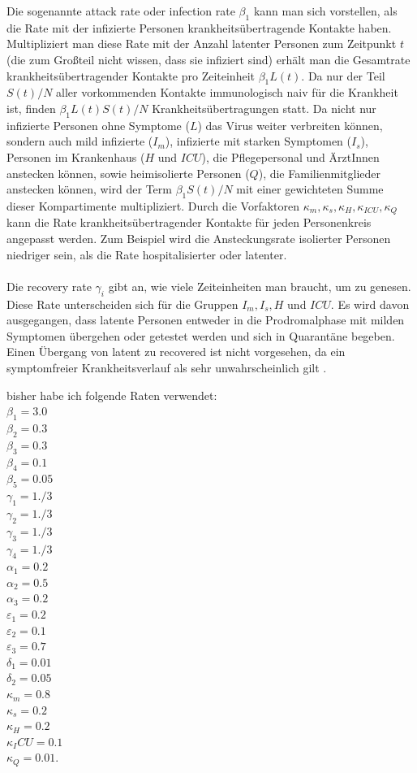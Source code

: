 \documentclass[twoside]{article}
\begin{document}
Die sogenannte attack rate oder infection rate $\beta_1$ kann man sich vorstellen, als die Rate mit der infizierte Personen krankheits\"ubertragende Kontakte haben. Multipliziert man diese Rate mit der Anzahl latenter Personen zum Zeitpunkt $t$ (die zum Gro\ss teil nicht wissen, dass sie infiziert sind) erh\"alt man die Gesamtrate krankheits\"ubertragender Kontakte pro Zeiteinheit $\beta_1 L(t)$. Da nur der Teil $S(t)/N$ aller vorkommenden Kontakte immunologisch naiv f\"ur die Krankheit ist, finden $\beta_1 L(t)S(t)/N$ Krankheits\"ubertragungen statt. 
Da nicht nur infizierte Personen ohne Symptome ($L$) das Virus weiter verbreiten k\"onnen, sondern auch mild infizierte ($I_m$), infizierte mit starken Symptomen ($I_s$), Personen im Krankenhaus ($H$ und $ICU$), die Pflegepersonal und \"ArztInnen anstecken k\"onnen, sowie heimisolierte Personen ($Q$), die Familienmitglieder anstecken k\"onnen, wird der Term $\beta_1 S(t)/N$ mit einer gewichteten Summe dieser Kompartimente multipliziert. Durch die Vorfaktoren $\kappa_m, \kappa_s, \kappa_H, \kappa_{ICU}, \kappa_Q$ kann die Rate krankheits\"ubertragender Kontakte f\"ur jeden Personenkreis angepasst werden. Zum Beispiel wird die Ansteckungsrate isolierter Personen niedriger sein, als die Rate hospitalisierter oder latenter.\\
{\ }\\
Die recovery rate $\gamma_i$ gibt an, wie viele Zeiteinheiten man braucht, um zu genesen. Diese Rate unterscheiden sich f\"ur die Gruppen $I_m, I_s, H$ und $ICU$. Es wird davon ausgegangen, dass latente Personen entweder in die Prodromalphase mit milden Symptomen \"ubergehen oder getestet werden und sich in Quarant\"ane begeben. Einen \"Ubergang von latent zu recovered ist nicht vorgesehen, da ein symptomfreier Krankheitsverlauf als sehr unwahrscheinlich gilt \cite{1}.

bisher habe ich folgende Raten verwendet:\\
$\beta_1 = 3.0$ \\
$\beta_2 = 0.3$ \\
$\beta_3 = 0.3$ \\
$\beta_4 = 0.1$ \\
$\beta_5 = 0.05$ \\
$\gamma_1 = 1./3$ \\
$\gamma_2 = 1./3$ \\
$\gamma_3 = 1./3$ \\
$\gamma_4 = 1./3$ \\
$\alpha_1 = 0.2$ \\
$\alpha_2 = 0.5$ \\
$\alpha_3 = 0.2$ \\
$\varepsilon_1 = 0.2$ \\
$\varepsilon_2 = 0.1$ \\
$\varepsilon_3 = 0.7$ \\
$\delta_1 = 0.01$ \\
$\delta_2 = 0.05$ \\
$\kappa_m = 0.8$ \\
$\kappa_s = 0.2$ \\
$\kappa_H = 0.2$ \\
$\kappa_ICU = 0.1$ \\
$\kappa_Q = 0.01$.
\end{document}
